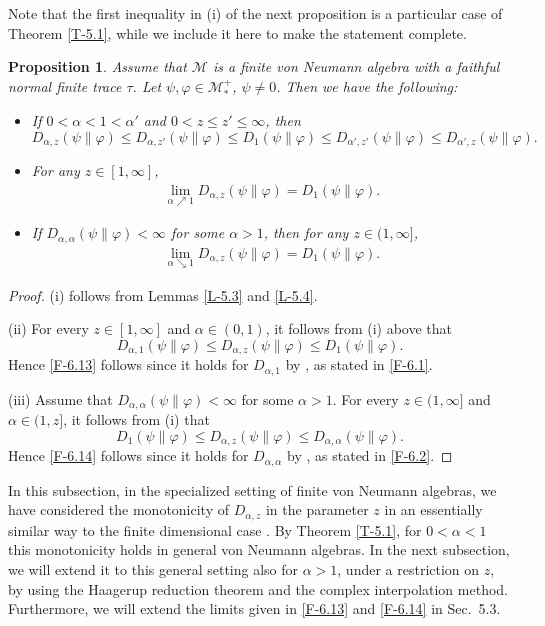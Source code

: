 \documentclass[12pt]{article}
\newtheorem{prop}[theorem]{Proposition}
\theoremstyle{definition}
\theoremstyle{remark}
\numberwithin{equation}{section}
\def\Me{\mathcal M}
\def\ffi{\varphi}
\begin{document}
{Note that the first inequality in (i) of the next proposition is a particular case of
Theorem \ref{T-5.1}, while we include it here to make the statement complete.

\begin{prop}\label{P-5.5}
Assume that $\Me$ is a finite von Neumann algebra with a faithful normal finite trace $\tau$.
Let $\psi,\ffi\in\Me_*^+$, $\psi\ne0$. Then we have the following:
\begin{itemize}
\item[(i)] If $0<\alpha<1<\alpha'$ and $0<z\le z'\le\infty$, then
\[
D_{\alpha,z}(\psi\|\ffi)\le D_{\alpha,z'}(\psi\|\ffi)\le D_1(\psi\|\ffi)
\le D_{\alpha',z'}(\psi\|\ffi)\le D_{\alpha',z}(\psi\|\ffi).
\]
\item[(ii)] For any $z\in[1,\infty]$,
\begin{align}\label{F-6.13}
\lim_{\alpha\nearrow1}D_{\alpha,z}(\psi\|\ffi)=D_1(\psi\|\ffi).
\end{align}
\item[(iii)] If $D_{\alpha,\alpha}(\psi\|\ffi)<\infty$ for some $\alpha>1$, then for any $z\in(1,\infty]$,
\begin{align}\label{F-6.14}
\lim_{\alpha\searrow1}D_{\alpha,z}(\psi\|\ffi)=D_1(\psi\|\ffi).
\end{align}
\end{itemize}
\end{prop}

\begin{proof}
(i) follows from Lemmas \ref{L-5.3} and \ref{L-5.4}.

(ii)\enspace
For every $z\in[1,\infty]$ and $\alpha\in(0,1)$, it follows from (i) above that
\[
D_{\alpha,1}(\psi\|\ffi)\le D_{\alpha,z}(\psi\|\ffi)\le D_1(\psi\|\ffi).
\]
Hence \eqref{F-6.13} follows since it holds for $D_{\alpha,1}$ by
\cite[Proposition 5.3(3)]{hiai2018quantum}, as stated in \eqref{F-6.1}.

(iii)\enspace
Assume that $D_{\alpha,\alpha}(\psi\|\ffi)<\infty$ for some $\alpha>1$. For every $z\in(1,\infty]$
and $\alpha\in(1,z]$, it follows from (i) that
\[
D_1(\psi\|\ffi)\le D_{\alpha,z}(\psi\|\ffi)\le D_{\alpha,\alpha}(\psi\|\ffi).
\]
Hence \eqref{F-6.14} follows since it holds for $D_{\alpha,\alpha}$ by
\cite[Proposition 3.8(ii)]{jencova2018renyi}, as stated in \eqref{F-6.2}.
\end{proof}}

In this subsection, in the specialized setting of finite von Neumann algebras, we have considered the
monotonicity of $D_{\alpha,z}$ in the parameter $z$ in an essentially similar way to the finite dimensional
case \cite{lin2015investigating,mosonyi2023somecontinuity}. By Theorem
\ref{T-5.1}, for $0<\alpha<1$ this monotonicity holds in general von Neumann algebras. In the next
subsection, we will extend it to this general setting also for $\alpha>1$, under a
restriction on $z$, by using the Haagerup reduction theorem and the complex interpolation method. Furthermore,
we will extend the  limits given in \eqref{F-6.13} and \eqref{F-6.14} in Sec.~5.3.
\end{document}
